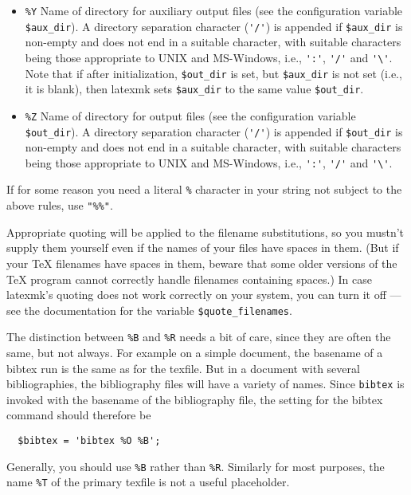\begin{itemize}
\item \verb|%Y|     Name of directory for auxiliary output files (see the
  configuration variable \verb|$aux_dir|).  A directory separation
  character (\verb|'/'|) is appended if \verb|$aux_dir| is
  non-empty and does not end in a suitable character, with
  suitable characters being those appropriate to UNIX and
  MS-Windows, i.e., \verb|':'|, \verb|'/'| and \verb|'\'|.   Note  that  if after
  initialization,  \verb|$out_dir| is set, but \verb|$aux_dir| is
  not set (i.e., it is blank), then latexmk  sets
  \verb|$aux_dir|  to  the  same value \verb|$out_dir|.

\item \verb|%Z|     Name  of directory for output files (see the configuration
        variable \verb|$out_dir|).  A directory separation character (\verb|'/'|)
        is  appended  if  \verb|$out_dir| is non-empty and does not end in a
        suitable character, with suitable characters being those  appropriate
        to UNIX and MS-Windows, i.e., \verb|':'|, \verb|'/'| and \verb|'\'|.

\end{itemize}

If  for  some  reason you need a literal \verb|%| character in your string not
subject to the above rules, use \verb|"%%"|.

Appropriate quoting will be applied to the filename  substitutions,  so
you  mustn't  supply them yourself even if the names of your files have
spaces in them.  (But if your TeX filenames have spaces in them, beware
that  some  older  versions  of the TeX program cannot correctly handle
filenames containing spaces.)  In case latexmk's quoting does not  work
correctly  on your system, you can turn it off --- see the documentation
for the variable \verb|$quote_filenames|.

The distinction between \verb|%B| and \verb|%R| needs a bit of care, since  they  are
often  the same, but not always.  For example on a simple document, the
basename of a bibtex run is the same as for the texfile.  But in a document
with  several bibliographies, the bibliography files will have a variety of
names.  Since \verb|bibtex| is invoked with  the  basename  of  the bibliography
file, the setting for the bibtex command should therefore be

\begin{verbatim}
  $bibtex = 'bibtex %O %B';
\end{verbatim}

Generally, you should use \verb|%B| rather than \verb|%R|.  Similarly for  most
purposes, the name \verb|%T| of the primary texfile is not a useful placeholder.


